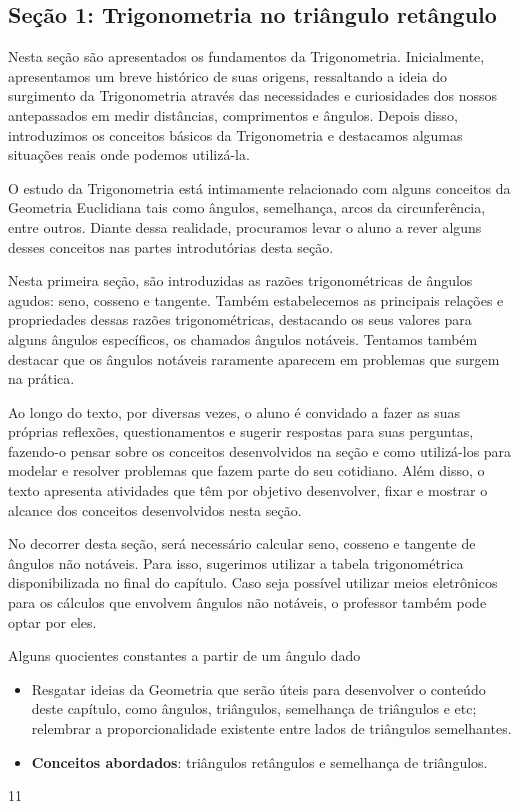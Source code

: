 \mainmatter

\def\currentcolor{session1}
\begin{texto}
{
    \section{Seção 1: Trigonometria no triângulo retângulo}

    Nesta seção são apresentados os fundamentos da Trigonometria. Inicialmente, apresentamos um breve histórico de suas origens, ressaltando a ideia do surgimento da Trigonometria através das necessidades e curiosidades dos nossos antepassados em medir distâncias, comprimentos e ângulos. Depois disso, introduzimos os conceitos básicos da Trigonometria e destacamos algumas situações reais onde podemos utilizá-la. 

    O estudo da Trigonometria está intimamente relacionado com alguns conceitos da Geometria Euclidiana tais como ângulos, semelhança, arcos da circunferência, entre outros. Diante dessa realidade, procuramos levar o aluno a rever alguns desses conceitos nas partes introdutórias desta seção.

    Nesta primeira seção, são introduzidas as razões trigonométricas de ângulos agudos: seno, cosseno e tangente. Também estabelecemos as principais relações e propriedades dessas razões trigonométricas, destacando os seus valores para alguns ângulos específicos, os chamados ângulos notáveis. Tentamos também destacar que os ângulos notáveis raramente aparecem em problemas que surgem na prática. 

    Ao longo do texto, por diversas vezes, o aluno é convidado a fazer as suas próprias reflexões, questionamentos e sugerir respostas para suas perguntas, fazendo-o pensar sobre os conceitos desenvolvidos na seção e como utilizá-los para modelar e resolver problemas que fazem parte do seu cotidiano. Além disso, o texto apresenta atividades que têm por objetivo desenvolver, fixar e mostrar o alcance dos conceitos desenvolvidos nesta seção.

    No decorrer desta seção, será necessário calcular seno, cosseno e tangente de ângulos não notáveis. Para isso, sugerimos utilizar a tabela trigonométrica disponibilizada no final do capítulo. Caso seja possível utilizar meios eletrônicos para os cálculos que envolvem ângulos não notáveis, o professor também pode optar por eles.
}
\end{texto}
\clearmargin
\clearmargin
\begin{objectives}{Alguns quocientes constantes a partir de um ângulo dado}
{
\begin{itemize}
\item Resgatar ideias da Geometria que serão úteis para  desenvolver o conteúdo deste capítulo, como ângulos, triângulos, semelhança de triângulos e etc; relembrar a proporcionalidade existente entre lados de triângulos semelhantes.

\item \textbf{Conceitos abordados}: triângulos retângulos e semelhança de triângulos.
\end{itemize}
}{1}{1}
\end{objectives}

